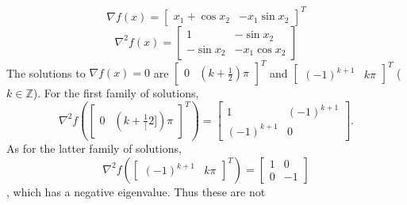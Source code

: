 \documentclass[11pt]{article}
\begin{document}
\subsection{}
$$\nabla f(x)=\begin{bmatrix}x_1+\cos x_2&-x_1\sin x_2\end{bmatrix}^T$$
$$\nabla^2f(x)=\begin{bmatrix}1&-\sin x_2\\-\sin x_2 & -x_1\cos x_2\end{bmatrix}$$
The solutions to $\nabla f(x)=0$ are $\begin{bmatrix} 0 & (k+\frac{1}{2})\pi\end{bmatrix}^T$ and $\begin{bmatrix} (-1)^{k+1} & k\pi \end{bmatrix}^T$ ($k\in \mathbb{Z}$). For the first family of solutions, $$\nabla ^2f(\begin{bmatrix} 0 & (k+\frac{1}[2])\pi\end{bmatrix}^T )=\begin{bmatrix} 1 & (-1)^{k+1} \\ (-1)^{k+1} & 0\end{bmatrix}.$$  As for the latter family of solutions, $$\nabla ^2f(\begin{bmatrix} (-1)^{k+1} & k\pi\end{bmatrix}^T )=\begin{bmatrix} 1 & 0 \\ 0 & -1\end{bmatrix}$$, which has a negative eigenvalue. Thus these are not 
\end{document}
